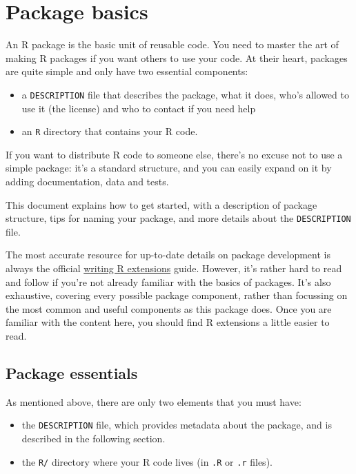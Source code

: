 \chapter{Package basics}

An R package is the basic unit of reusable code. You need to master the
art of making R packages if you want others to use your code. At their
heart, packages are quite simple and only have two essential components:

\begin{itemize}
\item
  a \texttt{DESCRIPTION} file that describes the package, what it does,
  who's allowed to use it (the license) and who to contact if you need
  help
\item
  an \texttt{R} directory that contains your R code.
\end{itemize}

If you want to distribute R code to someone else, there's no excuse not
to use a simple package: it's a standard structure, and you can easily
expand on it by adding documentation, data and tests.

This document explains how to get started, with a description of package
structure, tips for naming your package, and more details about the
\texttt{DESCRIPTION} file.

The most accurate resource for up-to-date details on package development
is always the official
\href{http://cran.r-project.org/doc/manuals/R-exts.html\#Creating-R-packages}{writing
R extensions} guide. However, it's rather hard to read and follow if
you're not already familiar with the basics of packages. It's also
exhaustive, covering every possible package component, rather than
focussing on the most common and useful components as this package does.
Once you are familiar with the content here, you should find R
extensions a little easier to read.

\section{Package essentials}

As mentioned above, there are only two elements that you must have:

\begin{itemize}
\item
  the \texttt{DESCRIPTION} file, which provides metadata about the
  package, and is described in the following section.
\item
  the \texttt{R/} directory where your R code lives (in \texttt{.R} or
  \texttt{.r} files).
\end{itemize}

